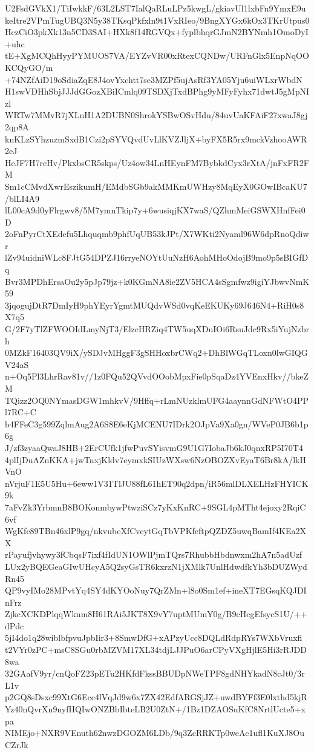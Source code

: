 U2FsdGVkX1/TiIwkkF/63L2LST7IalQaRLuLPz5kwgL/gkiavUl1lxbFn9YmxE9u
keItre2VPmTugUBQ3N5y38TKsqPkfxln9t1VxRIeo/9BngXYGx6kOx3TKrUtpus0
HczCiO3pkXk13n5CD3SAI+HXk8f14RGVQx+fyplbhqrGJmN2BYNmh1OmoDyI+uhc
tE+XgMCQhHyyPYMUOS7VA/EYZvVR00xRtexCQNDw/URFnGlx5EnpNqOOKCQyGO/m
+74NZfAiD19oSdiaZqE8J4ovYxchtt7se3MZPf5ujAsRf3YA05Yju6uiWLxrWbdN
H1swVDHhSbjJJJdGGozXBiICmlq09TSDXjTxdBPhg9yMFyFyhx71dwtJ5gMpNIzl
WRTw7MMvR7jXLnH1A2DUBN0ShrokYSBwOSvHdu/84uvUaKFAiF27xwaJ8gj2qp8A
knKLzSYhzuzmSxdB1Czi2pSYVQvdUvLlKVZJljX+byFX5R5rx9mckVzhooAWR2eJ
HeJF7H7rcHv/PkxbsCR5skps/Uz4ow34LnHEynFM7BybkdCyx3rXtA/jnFxFR2FM
Sm1cCMvdXwrEszikumH/EMdbSGb9akMMKmUWHzy8MqEyX0GOwIBcaKU7/blLI4A9
lL00cA9d0yFlrgwv8/5M7ymnTkip7y+6wusiqjKX7waS/QZhmMeiGSWXHnfFei0D
2oFnPyrCtXEdefu5Lhquqmb9phfUqUB53kJPt/X7WKti2Nyaml96W6dpRnoQdiwr
lZv94uidniWLc8FJtG54DPZJ16rryeNOYtUuNzH6AohMHoOdojB9mo9p5sBIGfDq
Bvr3MPDhErsaOu2y5pJp79jz+k0KGmNA8ie2ZV5HCA4sSgmfwz9igiYJbwvNmK59
3jqogujDtR7DmIyH9phYEyrYgmtMUQdvWSd0vqKeEKUKy69J646N4+RiH0s8X7q5
G/2F7yTlZFWOOIdLmyNjT3/ElzcHRZiq4TW5uqXDuIOi6RsuJdc9Rx5iYujNzbrh
0MZkF16403QV9iX/ySDJvMHggF3gSHHoxbrCWq2+DhBlWGqTLoxn0lwGIQGV24aS
n+Oq5Pl3LhrRav81v//1z0FQu52QVvdOOobMpxFie0pSqaDz4YVEnxHkv//bkeZM
TQizz2OQ0NYmasDGW1mhkvV/9Hffq+rLmNUzklmUFG4aaynnGdNFWtO4PPl7RC+C
b4FFeC3g599ZqlmAug2A6S8E6eKjMCENU7IDrk2OJpVa9Xa0gn/WVeP0JB6b1p6g
J/zf3zyaaQwaJ8HB+2ErCUfk1jfwPuvSYisvmG9U1G7IobaJb6kJ0qnxRP5I70T4
4plIjDuAZnKKA+jwTnxjKldv7eymxkSIUzWXsw6NzOBOZXvEyaT6Br8kA/lkHVnO
nVrjuF1E5U5Hu+6eww1V31TlJU88fL61hET90q2dpn/iR56mlDLXELHzFHYICK9k
7aFvZk3YrbmnB8BOKonmbywPtwziSCz7yKxKnRC+9SGL4pMTht4ejoxy2RqiC6vf
WgKfc89TBn46xlP9gq/nkvubeXfCvcytGqTbVPKfeftpQZDZ5uwqBamIf4KEa2XX
rPayufjvhywy3fCbqsF7ixf4fIdUN1OWlPjmTQrs7RhubbHbdnwxm2hA7n5adUzf
LUx2yBQEGeaGIwUHcyA5Q2syGsTR6kxrzN1jXMlk7UnlHdwdfkYh3bDUZWydRn45
QP9vyIMo28MPvtYq4SY4dKYOoNuy7QrZMn+l8o0Sm1ef+ineXT7EGsqKQJDInFrz
ZjkcXCKDPlqqWknm8H61RAi5JKT8X9vY7uptMUmY0g/B9cHcgEfsycS1U/++dPdc
5jI4do1q28wiblbfpvuJpbIir3+8SmwDfG+xAPzyUcc8DQLdRdpRYs7WXbVruxfi
t2VYr0zPC+msC8SGu0rbMZVM17XL34tdjLJJPuO6arCPyVXgHjlE5Hi3rRJDD8wa
32GAafV9yr/cnQoFZ23pETu2HKfdFkssBBUDpNWeTPF8gdNHYkadN8cJt0/3rL1v
p2GQ8sDsxc99XtG6Ecc4lVqJd9w6x7ZX42EdfARGSjJZ+uwdBYFf3E0lxthd5kjR
Yz40nQvrXn9nyfHQIwONZBbIbteLB2U0ZtN+/1Bz1DZAOSuKfC8NrtlUcte5+xpa
NIMEjo+NXR9VEnuth62nwzDGOZM6LDb/9q3ZcRRKTp0weAc1ufl1KuXJ8OuCZrJk
